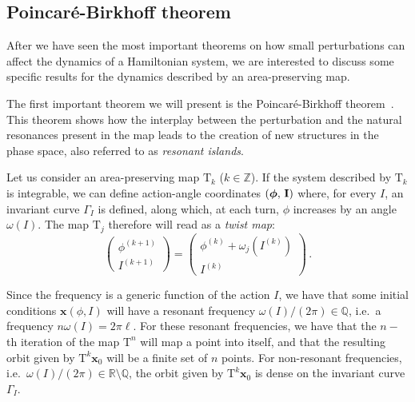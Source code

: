 \subsection{Poincaré-Birkhoff theorem}\label{subsec:poincare-birkhoff}

After we have seen the most important theorems on how small perturbations can affect the dynamics of a Hamiltonian system, we are interested to discuss some specific results for the dynamics described by an area-preserving map.

The first important theorem we will present is the Poincaré-Birkhoff theorem~\cite{birkhoff}. This theorem shows how the interplay between the perturbation and the natural resonances present in the map leads to the creation of new structures in the phase space, also referred to as \textit{resonant islands}.

Let us consider an area-preserving map $\mathrm{T}_k$ ($k\in\mathbb{Z}$). If the system described by $\mathrm{T}_k$ is integrable, we can define action-angle coordinates $(\boldsymbol{\phi},\,\vb{I})$ where, for every $I$, an invariant curve $\Gamma_{I}$ is defined, along which, at each turn, $\phi$ increases by an angle $\omega(I)$. The map $\mathrm{T}_j$ therefore will read as a \textit{twist map}:
%
\begingroup
\renewcommand*{\arraystretch}{1.5}
\begin{equation}
	\begin{pmatrix} {\phi}^{(k+1)} \\ {I}^{(k+1)} \end{pmatrix}  = \begin{pmatrix} {\phi}^{(k)} + {\omega}_j\left({I}^{(k)}\right) \\ {I}^{(k)} \end{pmatrix} \, .
\end{equation}
\endgroup

Since the frequency  is a generic function of the action $I$, we have that some initial conditions $\mathbf{x}(\phi,I)$ will have a resonant frequency ${\omega}({I})/(2\pi)\in \mathbb{Q}$, i.e.\ a frequency $n\omega(I)=2\pi \ell$. For these resonant frequencies, we have that the $n-$th iteration of the map $\mathrm{T}^n$ will map a point into itself, and that the resulting orbit given by $\mathrm{T}^k \mathbf{x}_0$ will be a finite set of $n$ points. For non-resonant frequencies, i.e.\ $\omega(I)/(2\pi) \in \mathbb{R}\setminus \mathbb{Q}$, the orbit given by $\mathrm{T}^k \mathbf{x}_0$ is dense on the invariant curve $\Gamma_{I}$.

